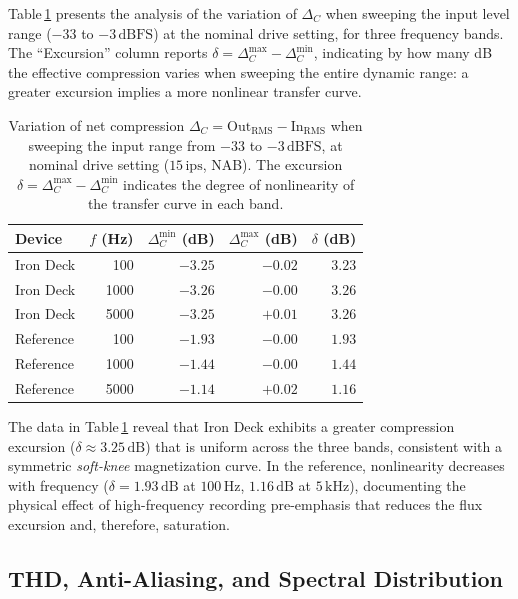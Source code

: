 \documentclass[10pt,conference]{IEEEtran}
\begin{document}
Table\,\ref{tab:compresion} presents the analysis of the variation of $\Delta_C$ when sweeping the
input level range ($-33$ to $-3\,\text{dBFS}$) at the nominal drive setting, for three frequency bands.
The ``Excursion'' column reports $\delta = \Delta_C^{\text{max}} - \Delta_C^{\text{min}}$,
indicating by how many dB the effective compression varies when sweeping the entire dynamic range:
a greater excursion implies a more nonlinear transfer curve.

\begin{table}[htbp]
\caption{Variation of net compression $\Delta_C = \text{Out}_\text{RMS} -
\text{In}_\text{RMS}$ when sweeping the input range from $-33$ to $-3\,\text{dBFS}$,
at nominal drive setting ($15\,\text{ips}$, NAB). The excursion
$\delta = \Delta_C^{\text{max}} - \Delta_C^{\text{min}}$ indicates the degree
of nonlinearity of the transfer curve in each band.}
\label{tab:compresion}
\centering
\small
\begin{tabular}{lrrrr}
\toprule
Device & $f$ (Hz) & $\Delta_C^{\text{min}}$ (dB) & $\Delta_C^{\text{max}}$ (dB) & $\delta$ (dB) \\
\midrule
Iron Deck  & 100  & $-3.25$ & $-0.02$ & $3.23$ \\
Iron Deck  & 1000 & $-3.26$ & $-0.00$ & $3.26$ \\
Iron Deck  & 5000 & $-3.25$ & $+0.01$ & $3.26$ \\
\midrule
Reference & 100  & $-1.93$ & $-0.00$ & $1.93$ \\
Reference & 1000 & $-1.44$ & $-0.00$ & $1.44$ \\
Reference & 5000 & $-1.14$ & $+0.02$ & $1.16$ \\
\bottomrule
\end{tabular}
\end{table}

The data in Table\,\ref{tab:compresion} reveal that Iron Deck exhibits a greater compression
excursion ($\delta \approx 3.25\,\text{dB}$) that is uniform across the three bands, consistent
with a symmetric \emph{soft-knee} magnetization curve. In the reference, nonlinearity decreases
with frequency ($\delta = 1.93\,\text{dB}$ at $100\,\text{Hz}$, $1.16\,\text{dB}$ at $5\,\text{kHz}$),
documenting the physical effect of high-frequency recording pre-emphasis that reduces the flux
excursion and, therefore, saturation.

\subsection{THD, Anti-Aliasing, and Spectral Distribution}
\label{sec:thd}
\end{document}
